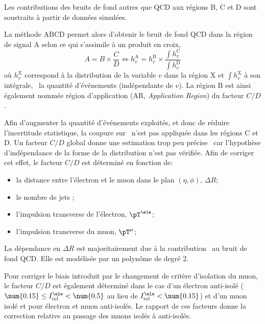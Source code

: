 Les contributions des bruits de fond autres que QCD aux régions B, C et D sont soustraits à partir de données simulées.
\par
La méthode ABCD permet alors d'obtenir le bruit de fond QCD dans la région de signal A selon ce qui s'assimile à un produit en croix,
\begin{equation}
A = B \times \frac{C}{D} \Leftrightarrow h_v^\text{A} = h_v^\text{B} \times \frac{\int h_v^\text{C}}{\int h_v^\text{D}}
\end{equation}
où $h_v^\text{X}$ correspond à la distribution de la variable $v$ dans la région X et $\int h_v^\text{X}$ à son intégrale, \ie\ la quantité d'événements (indépendante de $v$).
La région B est ainsi également nommée région d'application (AR, \emph{Application Region}) du facteur $C/D$.
\par
Afin d'augmenter la quantité d'événements exploités, et donc de réduire l'incertitude statistique, la coupure sur \Dzeta\ n'est pas appliquée dans les régions C et D.
Un facteur $C/D$ global donne une estimation trop peu précise~\cite{CMS-PAS-HIG-18-032} car l'hypothèse d'indépendance de la forme de la distribution n'est pas vérifiée.
Afin de corriger cet effet, le facteur $C/D$ est déterminé en fonction de:
\begin{itemize}
\item la distance entre l'électron et le muon dans le plan $(\eta,\phi)$, $\Delta R$;
\item le nombre de jets \Njets;
\item l'impulsion transverse de l'électron, $\pT^{\ele}$;
\item l'impulsion transverse du muon, $\pT^{\mu}$;
\end{itemize}
La dépendance en $\Delta R$ est majoritairement due à la contribution \quarkb\antiquarkb\ au bruit de fond QCD.
Elle est modélisée par un polynôme de degré 2.
\par
Pour corriger le biais introduit par le changement de critère d'isolation du muon, le facteur $C/D$ est également déterminé dans le cas d'un électron anti-isolé ($\num{0.15}\leq I_\text{rel}^{\ele} < \num{0.5}$ au lieu de $I_\text{rel}^{\ele} < \num{0.15}$) et d'un muon isolé et pour électron et muon anti-isolés.
Le rapport de ces facteurs donne la correction relative au passage des muons isolés à anti-isolés.